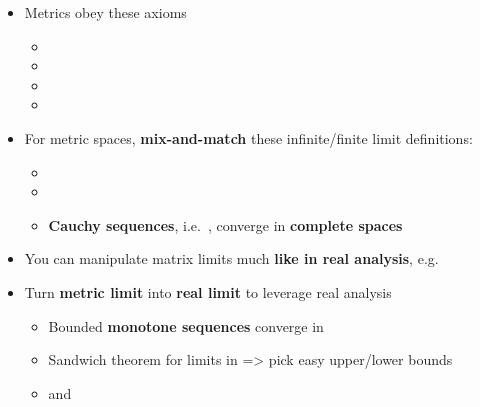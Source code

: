 \begin{itemize}

  \item
        Metrics obey these axioms

        \begin{itemize}

          \item
          \item
          \item
          \item
        \end{itemize}
  \item
        For metric spaces, \textbf{mix-and-match} these infinite/finite limit
        definitions:

        \begin{itemize}

          \item
          \item
          \item
                \textbf{Cauchy sequences},
                i.e.~,
                converge in \textbf{complete spaces}
        \end{itemize}
  \item
        You can manipulate matrix limits much \textbf{like in real analysis},
        e.g.~
  \item
        Turn \textbf{metric limit} 
        into \textbf{real limit}
         to leverage real
        analysis

        \begin{itemize}

          \item
                Bounded \textbf{monotone sequences} converge in 
          \item
                Sandwich theorem for limits in  =\textgreater{}
                pick easy upper/lower bounds
          \item
                 and
        \end{itemize}
\end{itemize}